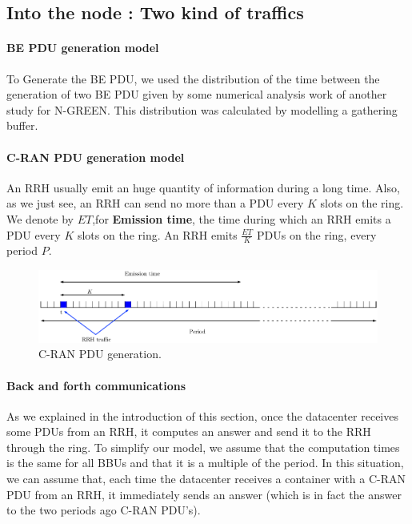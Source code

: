 \documentclass[]{algotel}
\begin{document}
\subsection{Into the node : Two kind of traffics}



\paragraph{BE PDU generation model} To Generate the BE PDU, we used the distribution of the time between the generation of two BE PDU given by some numerical analysis work of another study for N-GREEN. This distribution was calculated by modelling a gathering buffer.
  
 \paragraph{C-RAN PDU generation model} An RRH usually emit an huge quantity of information during a long time. Also, as we just see, an RRH can send no more than a PDU every $K$ slots on the ring.
 We denote by $ET$,for {\bf Emission time}, the time during which an RRH emits a PDU every $K$ slots on the ring. An RRH emits $\frac{ET}{K}$ PDUs on the ring, every period $P$.
    	    
        \begin{figure}[h!]
\begin{center}   

      \includegraphics[width=\textwidth]{emission_antenna.pdf}
     \caption{C-RAN PDU generation.}
\end{center}
  \end{figure}
  \paragraph{Back and forth communications} As we explained in the introduction of this section, once the datacenter receives some PDUs from an RRH, it computes an answer and send it to the RRH through the ring. To simplify our model, we assume that the computation times is the same for all BBUs and that it is a multiple of the period. In this situation, we can assume that, each time the datacenter receives a container with a C-RAN PDU from an RRH, it immediately sends an answer (which is in fact the answer to the two periods ago C-RAN PDU's).
  
\end{document}
